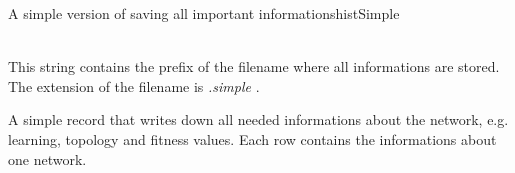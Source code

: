 \begin{moduledoc}{A simple version of saving all important informations}{histSimple}

\item[\KeyWord{historyFile} \Param{filename}]~\\
This string contains the prefix of the filename where all informations are stored.
The extension of the filename is {\it .simple  }.
\end{moduledoc}

A simple record that writes down all needed informations about the network,
e.g. learning, topology and fitness values.
Each row  contains the informations about one network.
